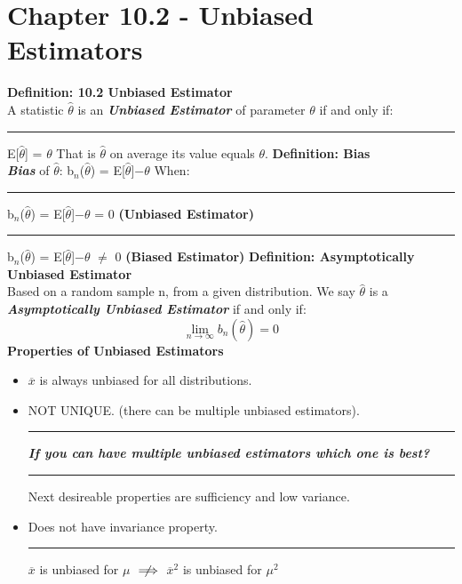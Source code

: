 \documentclass[]{article}
\begin{document}
\maketitle

\newpage
\Huge\section{Chapter 10.2 - Unbiased Estimators}

\Large\textbf{Definition: 10.2 Unbiased Estimator}
\\
A statistic $\hat\theta$ is an \textbf{\textit{Unbiased Estimator}} of parameter $\theta$ if and only if:\newline
\Large\rule{5cm}{0pt} E[$\hat\theta$] = $\theta$\newline
That is $\hat\theta$ on average its value equals $\theta$.
\newline
\newline
\newline
\Large\textbf{Definition: Bias}
\\
\Large\textbf{\textit{Bias}}  of $\hat\theta$: b$_n$($\hat\theta$) = E[$\hat\theta$]$ - \theta$\newline
When:\newline
\Large\rule{2.3cm}{0pt} b$_n$($\hat\theta$) =  E[$\hat\theta$]$ - \theta$ = 0 \textbf{(Unbiased Estimator)}\newline
\Large\rule{2.3cm}{0pt} b$_n$($\hat\theta$) =  E[$\hat\theta$]$ - \theta$ $\neq$ 0 \textbf{(Biased Estimator)}
\newline
\newline
\newline
\Large\textbf{Definition: Asymptotically Unbiased Estimator}
\\
\Large Based on a random sample n, from a given distribution. We say $\hat\theta$ is a \textbf{\textit{Asymptotically Unbiased Estimator}}  if and only if: \newline
 \[ \lim_{n\to\infty} b_n(\hat\theta) = 0\] 
\newline
\newline
\Large\textbf{Properties of Unbiased Estimators}
\begin{itemize}
	\item $\overline{x}$ is always unbiased for all distributions.
	\item  NOT UNIQUE. (there can be multiple unbiased estimators).
	\newline\Large\rule{1cm}{0pt} \textbf{\textit{If you can have multiple unbiased estimators which one is best?}}
	\newline\Large\rule{1cm}{0pt} Next desireable properties are sufficiency and low variance.	
	\item Does not have invariance property.
	\newline\Large\rule{1cm}{0pt} $\overline{x}$ is unbiased for $\mu$ $ \centernot\implies  $ $\overline{x}^2$ is unbiased for $\mu^2$
\end{itemize}
\end{document}
